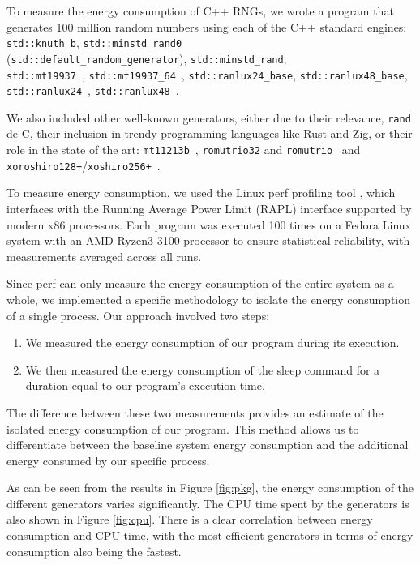 \documentclass[dvipsnames,format=sigconf,anonymous=true,review=true]{acmart}
\begin{document}
To measure the energy consumption of C++ RNGs, we wrote a program that generates 100 million random numbers using each of the C++ standard engines: \texttt{std::knuth\_b},  \texttt{std::minstd\_rand0} \\(\texttt{std::default\_random\_generator}),  \texttt{std::minstd\_rand}, \\ \texttt{std::mt19937}~\cite{mersennetwister},  \texttt{std::mt19937\_64}~\cite{mersennetwister}, \texttt{std::ranlux24\_base}, \texttt{std::ranlux48\_base},  \texttt{std::ranlux24}~\cite{JAMES1994111}, \texttt{std::ranlux48}~\cite{JAMES1994111}.

We also included other well-known generators, either due to their relevance, \texttt{rand} de C, their inclusion in trendy programming languages like Rust and Zig, or their role in the state of the art: \texttt{mt11213b}~\cite{mersennetwister}, \texttt{romutrio32} and \texttt{romutrio}~\cite{overton2020romufastnonlinearpseudorandom} and \texttt{xoroshiro128+}/\-\texttt{xoshiro256+}~\cite{blackman2021scrambled}.

To measure energy consumption, we used the Linux perf profiling tool \cite{perf}, which interfaces with the Running Average Power Limit (RAPL) interface \cite{rapl} supported by modern x86 processors. Each program was executed 100 times on a Fedora Linux system with an AMD Ryzen3 3100 processor to ensure statistical reliability, with measurements averaged across all runs.

Since perf can only measure the energy consumption of the entire system as a whole, we implemented a specific methodology to isolate the energy consumption of a single process. Our approach involved two steps:

\begin{enumerate}
\item We measured the energy consumption of our program during its execution.
\item We then measured the energy consumption of the sleep command for a duration equal to our program's execution time.
\end{enumerate}

The difference between these two measurements provides an estimate of the isolated energy consumption of our program. This method allows us to differentiate between the baseline system energy consumption and the additional energy consumed by our specific process.

As can be seen from the results in Figure \ref{fig:pkg}, the energy consumption of the different generators varies significantly. The CPU time spent by the generators is also shown in Figure \ref{fig:cpu}. There is a clear correlation between energy consumption and CPU time, with the most efficient generators in terms of energy consumption also being the fastest.
\end{document}
